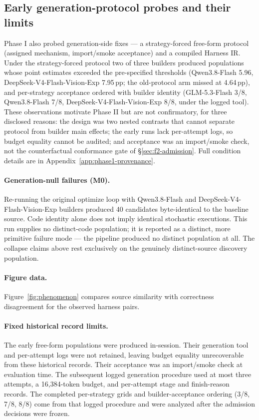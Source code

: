 \subsection{Early generation-protocol probes and their limits}\label{sec:phase1probes}
Phase I also probed generation-side fixes --- a strategy-forced free-form protocol
(assigned mechanism, import/smoke acceptance) and a compiled Harness IR. Under the
strategy-forced protocol two of three builders produced populations whose point
estimates exceeded the pre-specified thresholds (Qwen3.8-Flash 5.96,
DeepSeek-V4-Flash-Vision-Exp 7.95\,pp; the old-protocol arm missed at
4.64\,pp), and per-strategy acceptance ordered with builder identity
(GLM-5.3-Flash 3/8, Qwen3.8-Flash 7/8, DeepSeek-V4-Flash-Vision-Exp 8/8,
under the logged tool). These
observations motivate Phase II but are not confirmatory, for three disclosed reasons:
the design was two nested contrasts that cannot separate protocol from builder main
effects; the early runs lack per-attempt logs, so budget equality cannot be audited;
and acceptance was an import/smoke check, not the counterfactual conformance gate of
\S\ref{sec:f2-admission}. Full condition details are in Appendix~\ref{app:phase1-provenance}.

\paragraph{Generation-null failures (M0).} Re-running the original optimize loop
with Qwen3.8-Flash and DeepSeek-V4-Flash-Vision-Exp builders produced 40 candidates byte-identical to the
\bare{} baseline source. Code identity alone does not imply identical stochastic
executions. This run supplies no distinct-code population; it is reported as a distinct,
more primitive failure mode --- the pipeline produced no distinct population at all.
The collapse claims above rest exclusively on the genuinely distinct-source discovery
population.

\paragraph{Figure data.} Figure~\ref{fig:phenomenon} compares source
similarity with correctness disagreement for the observed harness pairs.

\paragraph{Fixed historical record limits.} The early free-form
populations were produced in-session. Their generation tool and
per-attempt logs were not retained, leaving budget equality
unrecoverable from these historical records. Their acceptance was an
import/smoke check at evaluation time. The subsequent logged generation
procedure used at most three attempts, a 16{,}384-token budget, and
per-attempt stage and finish-reason records. The completed per-strategy
grids and builder-acceptance ordering (3/8, 7/8, 8/8) come from that
logged procedure and were analyzed after the admission decisions were
frozen.

